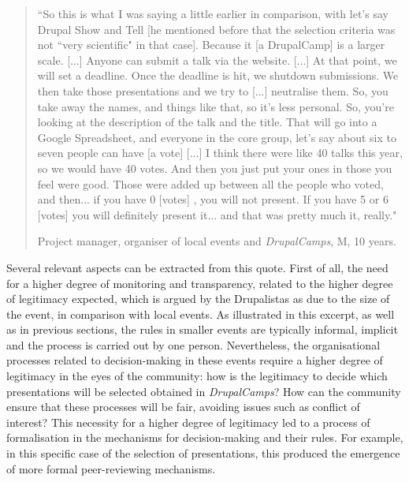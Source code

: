 \begin{quotation}
``So this is what I was saying a little earlier in comparison, with let's say Drupal Show and Tell [he mentioned before that the selection criteria was not ``very scientific" in that case]. Because it [a DrupalCamp] is a larger scale. [...] Anyone can submit a talk via the website. [...] At that point, we will set a deadline. Once the deadline is hit, we shutdown submissions. We then take those presentations and we try to [...] neutralise them. So, you take away the names, and things like that, so it's less personal. So, you're looking at the description of the talk and the title. That will go into a Google Spreadsheet, and everyone in the core group, let's say about six to seven people can have [a vote] [...] I think there were like 40 talks this year, so we would have 40 votes. And then you just put your ones in those you feel were good. Those were added up between all the people who voted, and then... if you have 0 [votes] , you will not present. If you have 5 or 6 [votes] you will definitely present it... and that was pretty much it, really."

\begin{flushright}\footnotesize{Project manager, organiser of local events and \textit{DrupalCamps}, M, 10 years.}\end{flushright}
\end{quotation}

Several relevant aspects can be extracted from this quote. First of all, the need for a higher degree of monitoring and transparency, related to the higher degree of legitimacy expected, which is argued by the Drupalistas as due to the size of the event, in comparison with local events. As illustrated in this excerpt, as well as in previous sections, the rules in smaller events are typically informal, implicit and the process is carried out by one person. Nevertheless, the organisational processes related to decision-making in these events require a higher degree of legitimacy in the eyes of the community: how is the legitimacy to decide which presentations will be selected obtained in \textit{DrupalCamps}? How can the community ensure that these processes will be fair, avoiding issues such as conflict of interest? This necessity for a higher degree of legitimacy led to a process of formalisation in the mechanisms for decision-making and their rules. For example, in this specific case of the selection of presentations, this produced the emergence of more formal peer-reviewing mechanisms.

